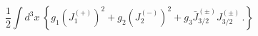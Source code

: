 \begin{equation}
\label{susybreak}
\frac12\int d^3x\ \left\{
g_1(J_1^{(+)})^2+g_2(J_2^{(-)})^2+g_3\bar{J}^{(\pm)}_{3/2}J^{(\pm)}_{3/2}\,.
\right\}
\end{equation}

